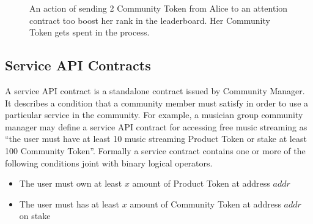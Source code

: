 \documentclass[letterpaper,11pt]{article}
\begin{document}
\begin{figure}[!h]
\centering
{}
\caption{An action of sending 2 Community Token from Alice to an attention contract too boost her rank in the leaderboard. Her Community Token gets spent in the process.}
\label{fig:attention-flow}
\end{figure}

\subsection{Service API Contracts} \label{sec:permission-contracts}
A service API contract is a standalone contract issued by Community Manager. It describes a condition that a community member must satisfy in order to use a particular service in the community. For example, a musician group community manager may define a service API contract for accessing free music streaming as ``the user must have at least 10 music streaming Product Token or stake at least 100 Community Token''. Formally a service contract contains one or more of the following conditions joint with binary logical operators.

\begin{itemize}
\setlength\itemsep{0em}
\item The user must own at least $x$ amount of Product Token at address $addr$
\item The user must has at least $x$ amount of Community Token at address $addr$ on stake
\end{itemize}
\end{document}
